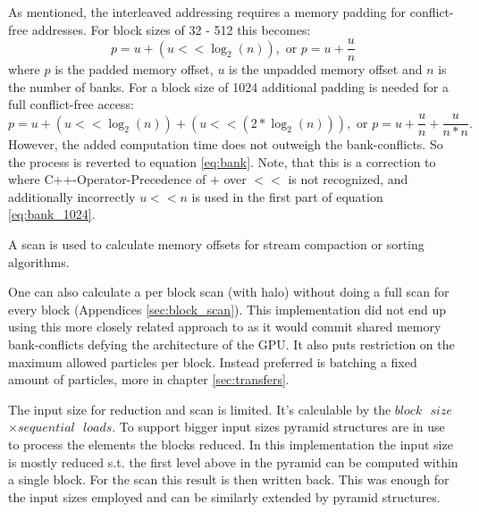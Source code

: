 \documentclass[m,times]{cgMA}
\begin{document}
As mentioned, the interleaved addressing requires a memory padding for conflict-free addresses. For block sizes of 32 - 512 this becomes:
\begin{equation}\label{eq:bank}
  p = u + (u << \log_2(n)), \text{ or }   p = u + \frac{u}{n}
\end{equation}
where $p$ is the padded memory offset, $u$ is the unpadded memory offset and $n$ is the number of banks.
For a block size of 1024 additional padding is needed for a full conflict-free access:
\begin{equation}\label{eq:bank_1024}
  p = u + (u << \log_2(n)) + (u << (2 * \log_2(n))), \text{ or }   p = u + \frac{u}{n} + \frac{u}{n*n}.
\end{equation}
However, the added computation time does not outweigh the bank-conflicts. So the process is reverted to equation \ref{eq:bank}. Note, that this is a correction to \cite{NVIDIA:SCAN} where C++-Operator-Precedence of $+$ over $<<$ is not recognized, and additionally incorrectly $ u << n$ is used in the first part of equation \ref{eq:bank_1024}.

A scan is used to calculate memory offsets for stream compaction or sorting algorithms.

One can also calculate a per block scan (with halo) without doing a full scan for every block (Appendices \ref{sec:block_scan}). This implementation did not end up using this more closely related approach to \cite{NVIDIA:NNSEARCH} as it would commit shared memory bank-conflicts defying the architecture of the GPU. It also puts restriction on the maximum allowed particles per block. Instead preferred is batching a fixed amount of particles, more in chapter \ref{sec:transfers}.


The input size for reduction and scan is limited. It's calculable by the $block\text{ }size$ $ \times sequential\text{ }loads$. To support bigger input sizes pyramid structures are in use to process the elements the blocks reduced. In this implementation the input size is mostly reduced s.t. the first level above in the pyramid can be computed within a single block. For the scan this result is then written back. This was enough for the input sizes employed and can be similarly extended by pyramid structures.
\end{document}
